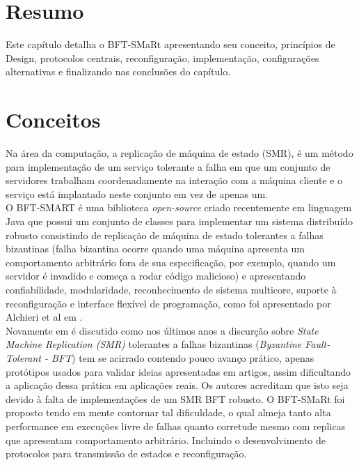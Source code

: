 \section{Resumo}
Este capítulo detalha o BFT-SMaRt apresentando seu conceito, princípios de Design, protocolos centrais, reconfiguração, implementação, configurações alternativas e finalizando nas conclusões do capítulo.


	\section{Conceitos}
	Na área da computação, a  replicação de máquina de estado (SMR), é um método para implementação de um serviço tolerante a falha em que um conjunto de servidores trabalham coordenadamente na interação com a máquina cliente e o serviço está implantado neste conjunto em vez de  apenas um. \\
	
	O BFT-SMART é uma biblioteca \textit{open-source} criado recentemente em linguagem Java que possui um conjunto de classes para implementar um sistema distribuído robusto consistindo de replicação de máquina de estado tolerantes a falhas bizantinas (falha bizantina ocorre quando uma máquina apresenta um comportamento arbitrário fora de sua especificação, por exemplo, quando um servidor é invadido e começa a rodar código malicioso) e apresentando confiabilidade, modularidade, reconhecimento de sistema multicore, suporte à reconfiguração e interface flexível de programação, como foi apresentado por Alchieri et al em \cite{bessani3}. \\
	
	Novamente em \cite{bessani3} é discutido como nos últimos anos a discurção sobre \textit{State Machine Replication (SMR)} tolerantes a falhas bizantinas (\textit{Byzantine Fault-Tolerant - BFT}) tem se acirrado contendo pouco avanço prático, apenas protótipos usados para validar ideias apresentadas em artigos, assim dificultando a aplicação dessa prática em aplicações reais. Os autores acreditam que isto seja devido à falta de implementações de um SMR BFT robusto. O BFT-SMaRt foi proposto tendo em mente contornar tal dificuldade, o qual almeja tanto alta performance em execuções livre de falhas quanto corretude mesmo com replicas que apresentam comportamento arbitrário. Incluindo o desenvolvimento de protocolos para transmissão de estados e reconfiguração. \\
	
